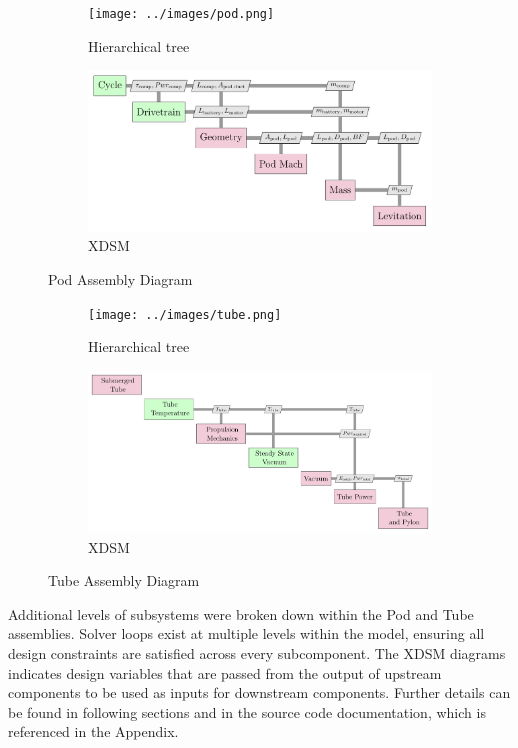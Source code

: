 \begin{figure}
\centering
\begin{subfigure}[t]{.5\textwidth}
  \centering
  \texttt{[image: ../images/pod.png]}
  \caption{Hierarchical tree}
  \label{fig:tree:pod}
\end{subfigure}%
\begin{subfigure}[t]{.5\textwidth}
  \centering
  \includegraphics{../images/xdsm/pod.pdf}
  \caption{XDSM}
  \label{fig:xdsm:pod}
\end{subfigure}
\caption{Pod Assembly Diagram}
\label{fig:pod}
\end{figure}

\begin{figure}
\centering
\begin{subfigure}[t]{.5\textwidth}
  \centering
  \texttt{[image: ../images/tube.png]}
  \caption{Hierarchical tree}
  \label{fig:tree:tube}
\end{subfigure}%
\begin{subfigure}[t]{.5\textwidth}
  \centering
  \includegraphics{../images/xdsm/tube.pdf}
  \caption{XDSM}
  \label{fig:xdsm:tube}
\end{subfigure}
\caption{Tube Assembly Diagram}
\label{fig:tube}
\end{figure}


Additional levels of subsystems were broken down within the Pod and Tube assemblies.
Solver loops exist at multiple levels within the model, ensuring all design
constraints are satisfied across every subcomponent.
The XDSM diagrams indicates design variables that are passed from the output of
upstream components to be used as inputs for downstream components.
Further details can be found in following sections and in the source code
documentation, which is referenced in the Appendix.

